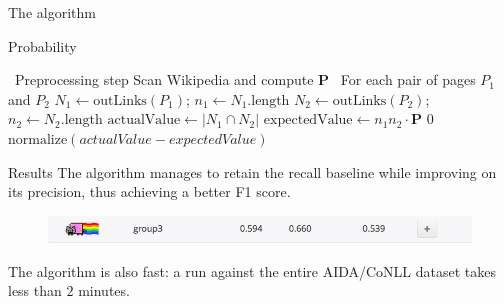 \documentclass[12pt]{beamer}
\begin{document}
    \begin{frame}{The algorithm}
        \begin{algorithm}[H]
            \caption{Probability}
            \begin{algorithmic}[]
                \STATE \, \COMMENT Preprocessing step
                \STATE Scan Wikipedia and compute \(\mathbf{P}\)
                \STATE \, \COMMENT For each pair of pages \(P_1\) and \(P_2\)
                \STATE \(N_{1} \leftarrow \text{outLinks}(P_1)\); \(n_{1} \leftarrow N_{1}.\text{length}\)
                \STATE \(N_{2} \leftarrow \text{outLinks}(P_2)\); \(n_{2} \leftarrow N_{2}.\text{length}\)
                \STATE \(\text{actualValue} \leftarrow \vert N_{1}\cap N_{2}\vert\)
                \STATE \(\text{expectedValue} \leftarrow n_{1}n_{2}\cdot \mathbf{P}\)
                    \RETURN \(0\)
                \ELSE
                    \RETURN \(\text{normalize}(actualValue - expectedValue)\)
                \ENDIF
            \end{algorithmic}
        \end{algorithm}
    \end{frame}

    \begin{frame}{Results}
        The algorithm manages to retain the recall baseline while improving on its
        precision, thus achieving a better F1 score.
        \begin{figure}
            \includegraphics[scale=0.35]{tex/img/nyan}
        \end{figure}

        The algorithm is also fast: a run against the entire AIDA/CoNLL dataset
        takes less than \(2\) minutes.
    \end{frame}
\end{document}
